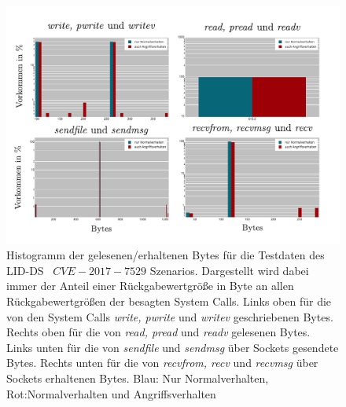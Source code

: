                     \begin{figure}[ht]
                        \centering
                        \includegraphics[width=\textwidth]{images/return_2017_plot.pdf}
                        \caption[Histogramm der geschriebenen und gelesenen Bytewerte]{Histogramm der gelesenen/erhaltenen Bytes für die Testdaten des \ac{LID-DS}~\cite{LID-DS} $CVE-2017-7529$ Szenarios.
                        Dargestellt wird dabei immer der Anteil einer Rückgabewertgröße in Byte an allen Rückgabewertgrößen der besagten System Calls.
                        Links oben für die von den System Calls \textit{write, pwrite} und \textit{writev} geschriebenen Bytes.
                        Rechts oben für die von \textit{read, pread} und \textit{readv} gelesenen Bytes.
                        Links unten für die von \textit{sendfile} und \textit{sendmsg} über Sockets gesendete Bytes.
                        Rechts unten für die von \textit{recvfrom, recv} und \textit{recvmsg} über Sockets erhaltenen Bytes.
                        Blau: Nur Normalverhalten, Rot:Normalverhalten und Angriffsverhalten}
                        \label{fig:return_values}
                    \end{figure}

